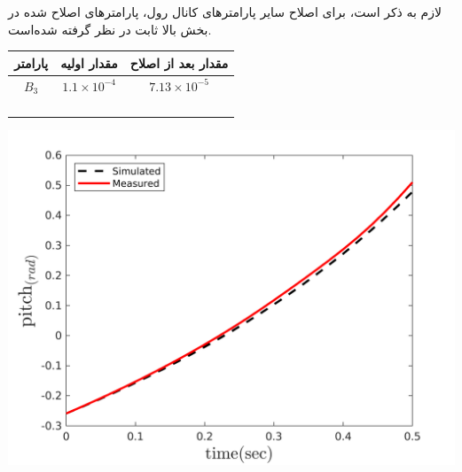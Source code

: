 

لازم به ذکر است، برای اصلاح سایر پارامترهای کانال رول، پارامترهای اصلاح شده در بخش بالا ثابت در نظر گرفته شده‌است.



\begin{minipage}[H]{\linewidth}
	\hfill
	\begin{minipage}[b]{0.49\linewidth}
		\centering
		\begin{tabular}{ccc}\hline
			پارامتر & مقدار اولیه  & مقدار بعد از اصلاح
			\\ \hline
			$B_3$  & $1.1\times10^{-4}$ & $7.13\times10^{-5}$ \\ \hline
			\\
			\\\\\\
		\end{tabular}
	\end{minipage}
	\begin{minipage}[b]{0.48\linewidth}
		\centering
		\includegraphics[width=1\linewidth]{../Figures/RCP/pitch_parameter_estimation/RCP_pitch_S1.png}
	\end{minipage}
\end{minipage}



